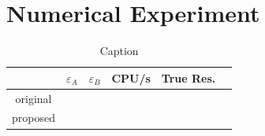 \section{Numerical Experiment}
\begin{table}[htbp]
    \centering
    \begin{tabular}{c c c c c c}
    \hline
         & $\varepsilon_A$ & $\varepsilon_B$ & CPU/s & True Res. \\
    \hline
    original& & & & &\\
    proposed& & & & &\\
    \hline
    \end{tabular}
    \caption{Caption}
    \label{tab:placeholder}
\end{table}